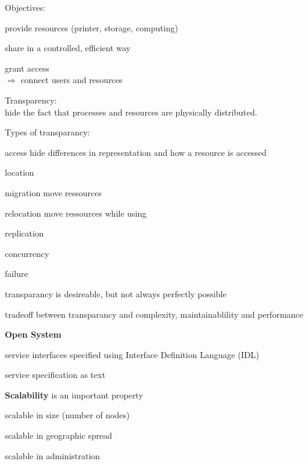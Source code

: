 \documentclass[ngerman,a4paper]{report}
\begin{document}
Objectives:\\
\begin{compactitem}
\item provide resources (printer, storage, computing)
\begin{compactitem}
\item share in a controlled, efficient way
\item grant access\\
$\Rightarrow$ connect users and resources
\end{compactitem}

\end{compactitem}

Transparency:\\
hide the fact that processes and resources are physically distributed.

Types of transparancy:\\
\begin{compactitem}
\item[access] hide differences in representation and how a resource is accessed
\item[location]
\item[migration] move ressources
\item[relocation] move ressources while using
\item[replication]
\item[concurrency]
\item[failure]
\end{compactitem}

transparancy is desireable, but not always perfectly possible

tradeoff between transparancy and complexity, maintainablility and performance

\textbf{Open System}

\begin{compactitem}
\item service interfaces specified using Interface Definition Language (IDL)
\item service specification as text
\end{compactitem}

\textbf{Scalability} is an important property

\begin{compactitem}
\item scalable in size (number of nodes)
\item scalable in geographic spread
\item scalable in administration
\end{compactitem}
\end{document}
